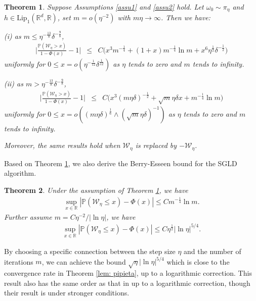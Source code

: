 \documentclass[12pt]{amsart}
\newtheorem{theorem}{Theorem}[section]
\theoremstyle{definition}
\theoremstyle{remark}
\numberwithin{equation}{section}
\newcommand{\R}{\mathbb{R}}\newcommand{\RR}{\mathbb{R}}
\newcommand{\PP}{\mathbb{P}}
\begin{document}
\begin{theorem}\label{thm-self-normal}
Suppose Assumptions \ref{assu1} and \ref{assu2} hold. Let $\omega_0\sim\pi_\eta$ and $h \in \mathrm{Lip}_1(\R^d,\R)$, set $m=o(\eta^{-2})$ with $m\eta\to\infty$. Then we have:

(i) as $m\le\eta^{-\frac{13}8}\delta^{-\frac98}$,
\begin{eqnarray*}
	\Big| \frac{\PP(\mathcal W_\eta> x)}{1-\Phi(x)}
	-1 \Big| & \le & 
	C\big(x^3m^{-\frac14}+(1+x)m^{-\frac14}\ln m+x^6\eta^{\frac12}\delta^{-\frac12}\big)
\end{eqnarray*}
uniformly for $0\le x=o(\eta^{{-\frac{1}{12}}}\delta^{\frac{1}{12}})$ as $\eta$ tends to zero and $m$ tends to infinity.  

(ii) as $m>\eta^{-\frac{13}8}\delta^{-\frac98}$,
\begin{eqnarray*}
	\Big| \frac{\PP(\mathcal W_\eta> x)}{1-\Phi(x)}
	-1 \Big| & \le & 
	C\big(x^3(m\eta\delta)^{-\frac12}+\sqrt m\eta\delta x+ m^{-\frac14}\ln m\big)
\end{eqnarray*}
uniformly for $0\le x=o( (m\eta\delta)^{\frac16}\wedge (\sqrt m\eta\delta)^{-1})$ as $\eta$ tends to zero and $m$ tends to infinity. 

Moreover, the same results hold when $\mathcal{W}_\eta$ is replaced by $-\mathcal{W}_\eta$.
\end{theorem}	


Based on Theorem \ref{thm-self-normal}, we also derive the Berry-Esseen bound for the SGLD algorithm. 

\begin{theorem}\label{coro:berry}
Under the assumption of Theorem \ref{thm-self-normal}, we have
\begin{eqnarray*}
	\sup_{x\in\R}|\PP(\mathcal{W}_\eta\le x)-\Phi(x)|\le Cm^{-\frac14}\ln m.
\end{eqnarray*}	
Further assume $m=C\eta^{-2}/|\ln\eta|$, we have
\begin{eqnarray*}
	\sup_{x\in\R}|\PP(\mathcal{W}_\eta\le x)-\Phi(x)|\le C\eta^{\frac12}|\ln \eta|^{5/4}.
\end{eqnarray*}	
\end{theorem}
By choosing a specific connection between the step size $\eta$ and the number of iterations $m$, we can achieve the bound $\sqrt \eta|\ln\eta|^{5/4}$ which is close to the convergence rate in Theorem \ref{lem: pipieta}, up to a logarithmic correction. This result also has the same order as that in \cite{fan2024normalized} up to a logarithmic correction, though their result is under stronger conditions.
\end{document}
